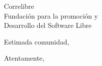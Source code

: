 \documentclass[11pt, a4paper]{letter} %
\begin{document}

\begin{letter}{
	Correlibre\\
	Fundación para la promoción y \\
	Desarrollo del Software Libre\\
}


\opening{Estimada comunidad,}



\closing{Atentamente, }




\end{letter}
\end{document}
